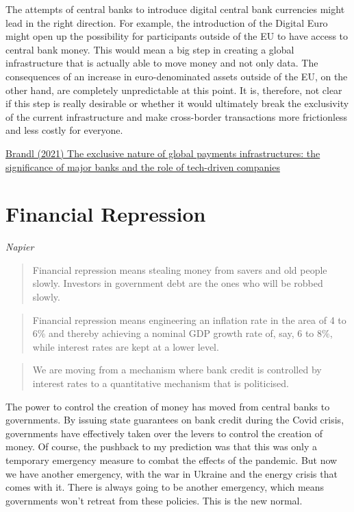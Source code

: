 \documentclass[
]{book}
\begin{document}
The attempts of central banks to introduce digital central bank currencies might lead in the right direction. For example, the introduction of the Digital Euro might open up the possibility for participants outside of the EU to have access to central bank money. This would mean a big step in creating a global infrastructure that is actually able to move money and not only data. The consequences of an increase in euro-denominated assets outside of the EU, on the other hand, are completely unpredictable at this point. It is, therefore, not clear if this step is really desirable or whether it would ultimately break the exclusivity of the current infrastructure and make cross-border transactions more frictionless and less costly for everyone.

\href{https://www.tandfonline.com/doi/full/10.1080/09692290.2021.2016470}{Brandl (2021) The exclusive nature of global payments infrastructures: the significance of major banks and the role of tech-driven companies}

\hypertarget{financial-repression}{%
\chapter{Financial Repression}\label{financial-repression}}

\emph{Napier}

\begin{quote}
Financial repression means stealing money from savers and old people slowly.
Investors in government debt are the ones who will be robbed slowly.
\end{quote}

\begin{quote}
Financial repression means engineering an inflation rate in the area of 4 to 6\% and thereby achieving a nominal GDP growth rate of, say, 6 to 8\%, while interest rates are kept at a lower level.
\end{quote}

\begin{quote}
We are moving from a mechanism where bank credit is controlled by interest rates to a quantitative mechanism that is politicised.
\end{quote}

The power to control the creation of money has moved from central banks to governments. By issuing state guarantees on bank credit during the Covid crisis, governments have effectively taken over the levers to control the creation of money. Of course, the pushback to my prediction was that this was only a temporary emergency measure to combat the effects of the pandemic. But now we have another emergency, with the war in Ukraine and the energy crisis that comes with it.
There is always going to be another emergency, which means governments won't retreat from these policies.
This is the new normal.
\end{document}
